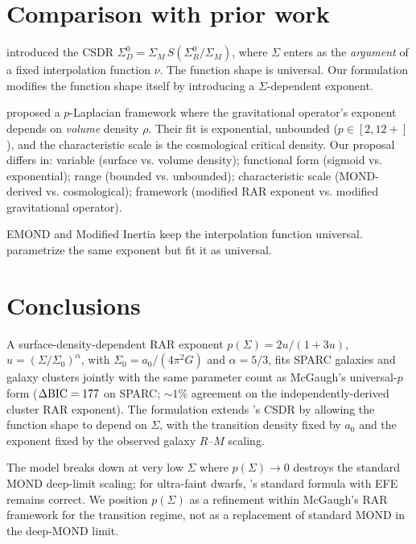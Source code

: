 \documentclass[twocolumn]{aastex631}
\begin{document}
\section{Comparison with prior work}

\citet{Milgrom2016} introduced the CSDR
$\Sigma_D^0 = \Sigma_M\,S(\Sigma_B^0/\Sigma_M)$, where $\Sigma$
enters as the \emph{argument} of a fixed interpolation function
$\nu$. The function shape is universal. Our formulation modifies
the function shape itself by introducing a $\Sigma$-dependent
exponent.

\citet{Scherer2025} proposed a $p$-Laplacian framework where the
gravitational operator's exponent depends on \emph{volume} density
$\rho$. Their fit is exponential, unbounded ($p \in [2, 12+]$), and
the characteristic scale is the cosmological critical density.
Our proposal differs in: variable (surface vs. volume density);
functional form (sigmoid vs. exponential); range (bounded vs.
unbounded); characteristic scale (MOND-derived vs. cosmological);
framework (modified RAR exponent vs. modified gravitational operator).

EMOND \citep{ZhaoFamaey2012} and Modified Inertia \citep{Milgrom2011}
keep the interpolation function universal. \citet{Desmond2024}
parametrize the same exponent but fit it as universal.

\section{Conclusions}

A surface-density-dependent RAR exponent $p(\Sigma) = 2u/(1+3u)$,
$u = (\Sigma/\Sigma_0)^\alpha$, with $\Sigma_0 = a_0/(4\pi^2 G)$ and
$\alpha = 5/3$, fits SPARC galaxies and galaxy clusters jointly with
the same parameter count as McGaugh's universal-$p$ form
($\Delta{\rm BIC} = 177$ on SPARC; $\sim 1\%$ agreement on the
independently-derived cluster RAR exponent). The formulation extends
\citet{Milgrom2016}'s CSDR by allowing the function shape to depend
on $\Sigma$, with the transition density fixed by $a_0$ and the
exponent fixed by the observed galaxy $R$--$M$ scaling.

The model breaks down at very low $\Sigma$ where $p(\Sigma) \to 0$
destroys the standard MOND deep-limit scaling; for ultra-faint dwarfs,
\citet{McGaugh2016Crater}'s standard formula with EFE remains
correct. We position $p(\Sigma)$ as a refinement within McGaugh's
RAR framework for the transition regime, not as a replacement of
standard MOND in the deep-MOND limit.
\end{document}
